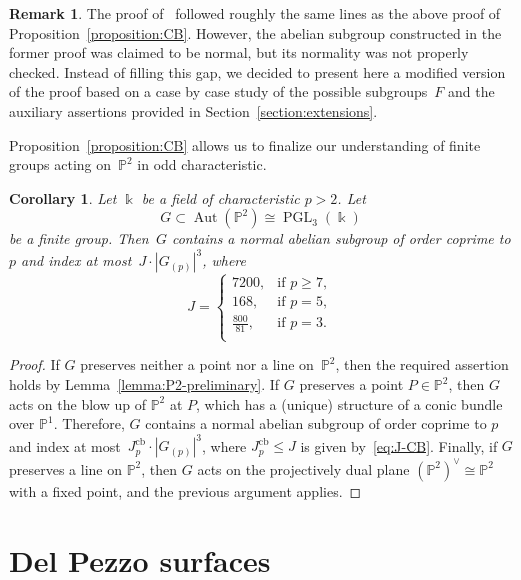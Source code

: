 \documentclass[12pt]{amsart}
\numberwithin{equation}{section}
\newtheorem{corollary}[subsection]{Corollary}
\theoremstyle{definition}
\newtheorem{remark}[subsection]{Remark}
\newcommand{\PP}{\mathbb P}
\DeclareMathOperator{\Aut}{Aut}
\DeclareMathOperator{\PGL}{PGL}
\def \ge {\geqslant}
\def \le {\leqslant}
\begin{document}
\begin{remark}
The proof of~\mbox{\cite[Lemma~9.2]{ChenShramov}} followed roughly the same lines as the above proof of Proposition~\ref{proposition:CB}.
However, the abelian subgroup constructed in the former proof was claimed to be normal,
but its normality was not properly checked. Instead of filling this gap, we decided to present here a modified version of the proof based on a case by case study
of the possible subgroups~$F$ and the auxiliary assertions
provided in Section~\ref{section:extensions}.
\end{remark}



Proposition~\ref{proposition:CB} allows us to finalize our understanding
of finite groups acting on~$\PP^2$ in odd characteristic.

\begin{corollary}\label{corollary:P2}
Let $\Bbbk$ be a field of characteristic $p>2$.
Let
$$
G\subset \Aut(\PP^2)\cong \PGL_3(\Bbbk)
$$
be a finite group.
Then~$G$ contains a normal abelian subgroup
of order coprime
to $p$ and index at most~\mbox{$J\cdot |G_{(p)}|^{3}$},
where
\begin{equation}\label{eq:constant-PGL3-odd}
J=\begin{cases}
7200, &\text{if\ } p\ge 7,\\
168, &\text{if\ } p=5,\\
\frac{800}{81}, &\text{if\ } p=3.\\
\end{cases}
\end{equation}
\end{corollary}

\begin{proof}
If $G$ preserves neither a point nor a line
on~$\PP^2$, then the required assertion holds by Lemma~\ref{lemma:P2-preliminary}.
If $G$ preserves a point $P\in \PP^2$, then $G$ acts on the blow up of $\PP^2$ at $P$, which
has a (unique) structure of a conic bundle over $\PP^1$. Therefore, $G$
contains a normal abelian subgroup
of order coprime
to $p$ and index at most~\mbox{$J_p^{\mathrm{cb}}\cdot |G_{(p)}|^{3}$},
where $J_p^{\mathrm{cb}}\le J$ is given by~\eqref{eq:J-CB}.
Finally, if $G$ preserves a line on $\PP^2$, then $G$ acts on the projectively dual plane $(\PP^2)^\vee\cong\PP^2$
with a fixed point, and the previous argument applies.
\end{proof}

\section{Del Pezzo surfaces}
\label{section:dP}
\end{document}
